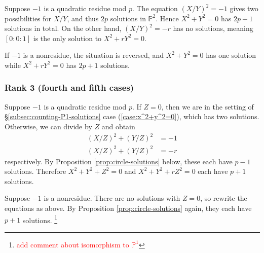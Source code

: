 \documentclass[10pt,a4paper]{amsart}
\numberwithin{equation}{section}
\numberwithin{figure}{section}
\theoremstyle{definition}
\theoremstyle{remark}
\theoremstyle{plain}
\theoremstyle{plain}
\theoremstyle{definition}
\theoremstyle{plain}
\theoremstyle{plain}
\renewcommand{\P}{\mathbb{P}}
\begin{document}
    Suppose $-1$ is a quadratic residue mod $p$. The equation $(X/Y)^2 = -1$ gives
    two possibilities for $X/Y$, and thus $2p$ solutions in $\mathbb{P}^2$. Hence
    $X^2 + Y^2 = 0$ has $2p + 1$ solutions in total. On the other hand, $(X/Y)^2 =
    -r$ has no solutions, meaning $[0:0:1]$ is the only solution to $X^2 + rY^2 =
    0$.

    If $-1$ is a nonresidue, the situation is reversed, and $X^2 + Y^2 = 0$ has one
    solution while $X^2 + rY^2 = 0$ has $2p + 1$ solutions.

    \subsubsection*{Rank 3 (fourth and fifth cases)} 
    Suppose $-1$ is a quadratic residue mod $p$. If $Z = 0$, then we are in the setting of
    \S\ref{subsec:counting-P1-solutions} case (\ref{case:x^2+y^2=0}), which has two
    solutions. Otherwise, we can divide by $Z$ and obtain 
    \begin{align*} 
        (X/Z)^2 + (Y/Z)^2 &= -1 \\ 
        (X/Z)^2 + (Y/Z)^2 &= -r 
    \end{align*} 
    respectively. By Proposition \ref{prop:circle-solutions} below, these each have $p - 1$
    solutions. Therefore $X^2 + Y^2 + Z^2 = 0$ and $X^2 + Y^2 + rZ^2 = 0$ each have
    $p+1$ solutions.

    Suppose $-1$ is a nonresidue. There are no solutions with $Z=0$, so rewrite the
    equations as above. By Proposition \ref{prop:circle-solutions} again, they each
    have $p + 1$ solutions. \footnote{\textcolor{red}{add comment about isomorphism
    to $\P^1$}}
\end{document}
